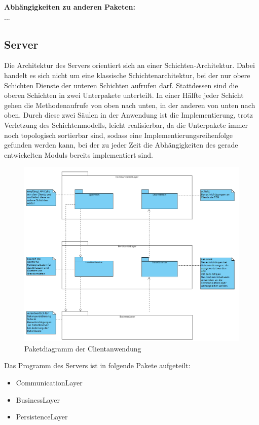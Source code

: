 \documentclass[11pt,a4paper]{article}
\begin{document}
\textbf{Abhängigkeiten zu anderen Paketen:}\\
...

\subsection{Server}
Die Architektur des Servers orientiert sich an einer Schichten-Architektur. Dabei handelt es sich nicht um eine klassische Schichtenarchitektur, bei der nur obere Schichten Dienste der unteren Schichten aufrufen darf. Stattdessen sind die oberen Schichten in zwei Unterpakete unterteilt. In einer Hälfte jeder Schicht gehen die Methodenaufrufe von oben nach unten, in der anderen von unten nach oben. Durch diese zwei Säulen in der Anwendung ist die Implementierung, trotz Verletzung des Schichtenmodells, leicht realisierbar, da die Unterpakete immer noch topologisch sortierbar sind, sodass
eine Implementierungsreihenfolge gefunden werden kann, bei der zu jeder Zeit die Abhängigkeiten des gerade entwickelten Moduls bereits implementiert sind.

\begin{figure}[H]
	\centering
	\includegraphics[scale=0.5]{../Klassendiagramme/paketdiagramm_server.png}
	\caption{Paketdiagramm der Clientanwendung}
\end{figure}

Das Programm des Servers ist in folgende Pakete aufgeteilt:
\begin{itemize}
	\item CommunicationLayer
	\item BusinessLayer
	\item PersistenceLayer
\end{itemize}
\end{document}
